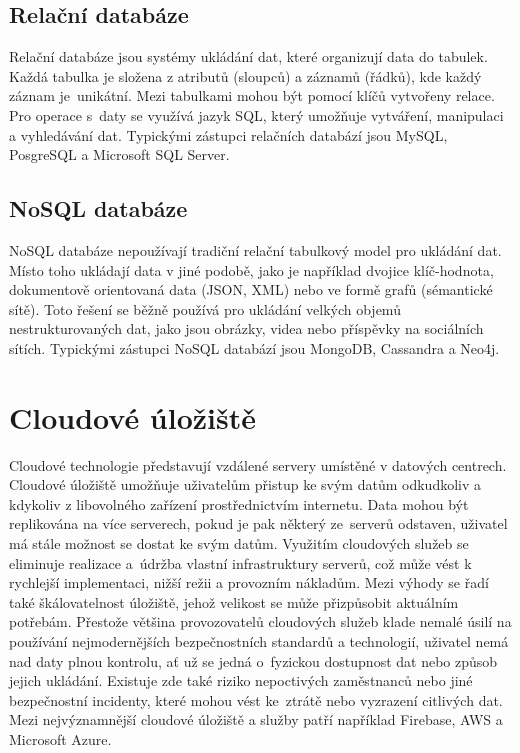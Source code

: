 \documentclass[czech, bc, kiv, he, iso690numb]{fasthesis}
\begin{document}
\subsection{Relační databáze} \label{lab:relational-database}

Relační databáze jsou systémy ukládání dat, které organizují data do tabulek. Každá tabulka je složena z atributů (sloupců) a záznamů (řádků), kde každý záznam je~unikátní. Mezi tabulkami mohou být pomocí klíčů vytvořeny relace. Pro operace s~daty se využívá jazyk \gls{SQL}, který umožňuje vytváření, manipulaci a vyhledávání dat. Typickými zástupci relačních databází jsou MySQL, PosgreSQL a Microsoft \gls{SQL} Server. \cite{storage-strategies-for-mobile-app-backend} \cite{relational-database}

\subsection{NoSQL databáze} \label{lab:nosql-database}

\gls{NoSQL} databáze nepoužívají tradiční relační tabulkový model pro ukládání dat. Místo toho ukládají data v jiné podobě, jako je například dvojice klíč-hodnota, dokumentově orientovaná data (\gls{JSON}, \gls{XML}) nebo ve formě grafů (sémantické sítě). Toto řešení se běžně používá pro ukládání velkých objemů nestrukturovaných dat, jako jsou obrázky, videa nebo příspěvky na sociálních sítích. Typickými zástupci \gls{NoSQL} databází jsou MongoDB, Cassandra a Neo4j. \cite{storage-strategies-for-mobile-app-backend} \cite{nosql-database}

\section{Cloudové úložiště} \label{cloud_storing} %

Cloudové technologie představují vzdálené servery umístěné v datových centrech. Cloudové úložiště umožňuje uživatelům přistup ke svým datům odkudkoliv a kdykoliv z libovolného zařízení prostřednictvím internetu. Data mohou být replikována na více serverech, pokud je pak některý ze~serverů odstaven, uživatel má stále možnost se dostat ke svým datům. Využitím cloudových služeb se eliminuje realizace a~údržba vlastní infrastruktury serverů, což může vést k rychlejší implementaci, nižší režii a provozním nákladům. Mezi výhody se řadí také škálovatelnost úložiště, jehož velikost se může přizpůsobit aktuálním potřebám. Přestože většina provozovatelů cloudových služeb klade nemalé úsilí na používání nejmodernějších bezpečnostních standardů a technologií, uživatel nemá nad daty plnou kontrolu, ať už se jedná o~fyzickou dostupnost dat nebo způsob jejich ukládání. Existuje zde také riziko nepoctivých zaměstnanců nebo jiné bezpečnostní incidenty, které mohou vést ke~ztrátě nebo vyzrazení citlivých dat. Mezi nejvýznamnější cloudové úložiště a služby patří například Firebase, \gls{AWS} a Microsoft Azure. \cite{cloud-storage} \cite{ibm-cloud-storage} \cite{amazon-cloud-storage}
\end{document}
